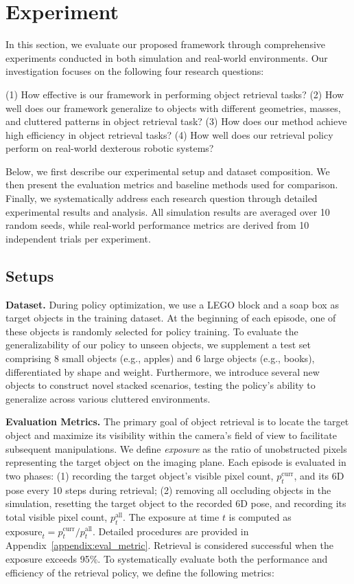 \documentclass[10pt, a4paper, logo, twocolumn, copyright]{psibot} %
\begin{document}
\section{Experiment}

In this section, we evaluate our proposed framework through comprehensive experiments conducted in both simulation and real-world environments. Our investigation focuses on the following four research questions:

(1) How effective is our framework in performing object retrieval tasks?
(2) How well does our framework generalize to objects with different geometries, masses, and cluttered patterns in object retrieval task?
(3) How does our method achieve high efficiency in object retrieval tasks?
(4) How well does our retrieval policy perform on real-world dexterous robotic systems?

Below, we first describe our experimental setup and dataset composition. We then present the evaluation metrics and baseline methods used for comparison. Finally, we systematically address each research question through detailed experimental results and analysis. All simulation results are averaged over 10 random seeds, while real-world performance metrics are derived from 10 independent trials per experiment.



\subsection{Setups}
\noindent \textbf{Dataset.} During policy optimization, we use a LEGO block and a soap box as target objects in the training dataset. At the beginning of each episode, one of these objects is randomly selected for policy training. To evaluate the generalizability of our policy to unseen objects, we supplement a test set comprising 8 small objects (e.g., apples) and 6 large objects (e.g., books), differentiated by shape and weight. Furthermore, we introduce several new objects to construct novel stacked scenarios, testing the policy’s ability to generalize across various cluttered environments.

\noindent \textbf{Evaluation Metrics.}
The primary goal of object retrieval is to locate the target object and maximize its visibility within the camera’s field of view to facilitate subsequent manipulations. We define \textit{exposure} as the ratio of unobstructed pixels representing the target object on the imaging plane. Each episode is evaluated in two phases: (1) recording the target object's visible pixel count, $p_t^\textrm{curr}$, and its 6D pose every 10 steps during retrieval; (2) removing all occluding objects in the simulation, resetting the target object to the recorded 6D pose, and recording its total visible pixel count, $p_t^\textrm{all}$. The exposure at time $t$ is computed as $\textrm{exposure}_t = p_t^\textrm{curr} / p_t^\textrm{all}$. Detailed procedures are provided in Appendix~\ref{appendix:eval_metric}. Retrieval is considered successful when the exposure exceeds 95\%. To systematically evaluate both the performance and efficiency of the retrieval policy, we define the following metrics:
\end{document}
